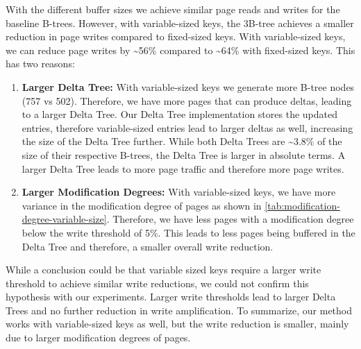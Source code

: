 With the different buffer sizes we achieve similar page reads and writes for the baseline B-trees.
However, with variable-sized keys, the 3B-tree achieves a smaller reduction in page writes compared to fixed-sized keys.
With variable-sized keys, we can reduce page writes by \textasciitilde56\% compared to \textasciitilde64\% with fixed-sized keys.
This has two reasons:
\begin{enumerate}
  \item \textbf{Larger Delta Tree:} 
  With variable-sized keys we generate more B-tree nodes (757 vs 502).
  Therefore, we have more pages that can produce deltas, leading to a larger Delta Tree.
  Our Delta Tree implementation stores the updated entries, therefore variable-sized entries lead to larger deltas as well, increasing the size of the Delta Tree further.
  While both Delta Trees are \textasciitilde3.8\% of the size of their respective B-trees, the Delta Tree is larger in absolute terms.
  A larger Delta Tree leads to more page traffic and therefore more page writes.
  \item \textbf{Larger Modification Degrees:}
  With variable-sized keys, we have more variance in the modification degree of pages as shown in \autoref{tab:modification-degree-variable-size}.
  Therefore, we have less pages with a modification degree below the write threshold of 5\%.
  This leads to less pages being buffered in the Delta Tree and therefore, a smaller overall write reduction.
\end{enumerate}

While a conclusion could be that variable sized keys require a larger write threshold to achieve similar write reductions, we could not confirm this hypothesis with our experiments.
Larger write thresholds lead to larger Delta Trees and no further reduction in write amplification.
To summarize, our method works with variable-sized keys as well, but the write reduction is smaller, mainly due to larger modification degrees of pages.

